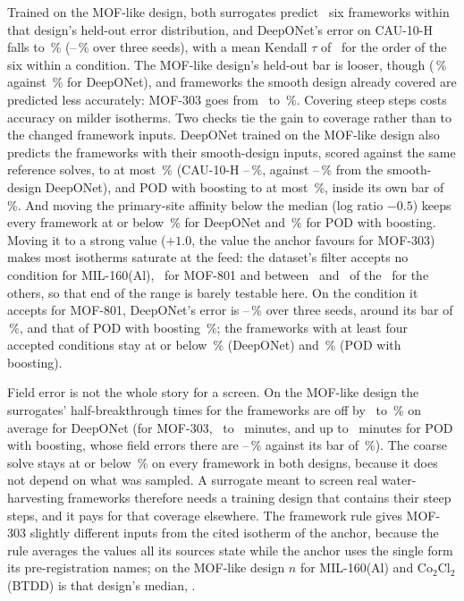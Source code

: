 \documentclass[10pt,a4paper]{article}
\begin{document}
Trained on the MOF-like design, both surrogates predict \nFwVthreeAllInside\ six frameworks
within that design's held-out error distribution, and DeepONet's error on CAU-10-H falls to
\nFwVthreeDonCau\,\% (\nFwAVthreeDonCauMin--\nFwAVthreeDonCauMax\,\% over three seeds), with
a mean Kendall \(\tau\) of \nFwVthreeTauDon\ for the order of the six within a condition. The
MOF-like design's held-out bar is looser, though
(\nFwVthreeDonPninetyfive\,\% against \nFwDonPninetyfive\,\% for DeepONet), and frameworks
the smooth design already covered are predicted less accurately: MOF-303 goes from
\nFwDonMofThree\ to \nFwVthreeDonMofThree\,\%. Covering steep steps costs accuracy on
milder isotherms. Two checks tie the gain to coverage rather than to the changed
framework inputs. DeepONet trained on the MOF-like design also predicts the frameworks with
their smooth-design inputs, scored against the same reference solves, to at most
\nFwAVtwoRuleMax\,\% (CAU-10-H \nFwAVtwoDonCauMin--\nFwAVtwoDonCauMax\,\%, against
\nSeedCauMin--\nSeedCauMax\,\% from the smooth-design DeepONet), and POD with boosting to at
most \nFwAHgbVtwoRuleMax\,\%, inside its own bar of \nFwVthreeHgbPninetyfive\,\%. And moving
the primary-site affinity below the median (log ratio \(-0.5\)) keeps every framework at or
below \nFwASensWeakMax\,\% for DeepONet and \nFwAHgbSensWeakMax\,\% for POD with boosting.
Moving it to a
strong value (\(+1.0\), the value the anchor favours for MOF-303) makes most isotherms
saturate at the feed: the dataset's filter accepts no condition for MIL-160(Al),
\nFwASensMofEightN\ for
MOF-801 and between \nFwASensStrongNmin\ and \nFwASensStrongNmax\ of the
\nDataNconditions\ for the others, so that end of the range is barely testable here. On the
condition it accepts for MOF-801, DeepONet's error is \nFwASensMofEightMin--\nFwASensMofEightMax\,\%
over three seeds, around its bar of \nFwVthreeDonPninetyfive\,\%, and that of POD with
boosting \nFwAHgbSensMofEightMax\,\%; the frameworks with at least four accepted conditions
stay at or below \nFwASensStrongWellMax\,\% (DeepONet) and \nFwAHgbSensStrongWellMax\,\% (POD
with boosting).

Field error is not the whole story for a screen. On the MOF-like design the surrogates'
half-breakthrough times for the frameworks are off by \nFwATfiftyDonRelMin\ to
\nFwATfiftyDonRelMax\,\% on average for DeepONet (for MOF-303, \nFwATfiftyDonMofThreeMin\ to
\nFwATfiftyDonMofThreeMax\ minutes, and up to \nFwATfiftyHgbMofThreeMax\ minutes for POD
with boosting, whose field errors there are \nFwAHgbVthreeMin--\nFwAHgbVthreeMax\,\% against
its bar of \nFwVthreeHgbPninetyfive\,\%). The coarse solve stays at or below
\nFwVthreeCoMax\,\% on every framework in both designs, because it does not depend on what
was sampled. A surrogate meant to screen real water-harvesting frameworks therefore needs a
training design that contains their steep steps, and it pays for that coverage elsewhere.
The framework rule gives MOF-303 slightly different inputs from the cited isotherm of the
anchor, because the rule averages the values all its sources state while the anchor uses
the single form its pre-registration names; on the MOF-like design \(n\) for MIL-160(Al) and
Co\(_2\)Cl\(_2\)(BTDD) is that design's median, \nFwNMed.
\end{document}
